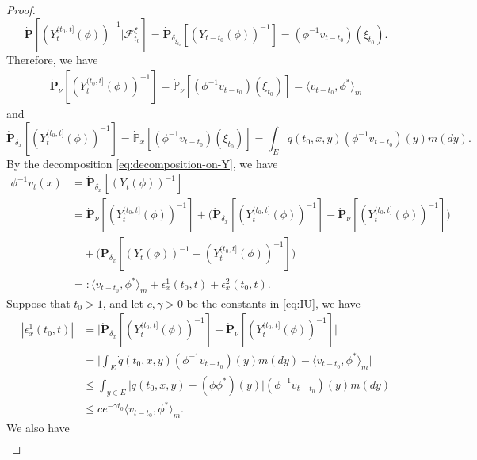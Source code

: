 \documentclass[UTF8]{pkuthss}
\theoremstyle{plain}
\theoremstyle{definition}
\numberwithin{equation}{section}
\begin{document}
\begin{proof}
\[
	\dot{\mathbf P} [(Y_t^{(t_0,t]}(\phi))^{-1}|\mathscr F^\xi_{t_0}]
	= \dot{\mathbf P}_{\delta_{\xi_{t_0}}}[(Y_{t-t_0}(\phi))^{-1}]
	= (\phi^{-1}v_{t-t_0})(\xi_{t_0}).
\]
	Therefore, we have
\[\begin{split}
	\dot{\mathbf P}_\nu[(Y_t^{(t_0,t]}(\phi))^{-1}]
	= \dot{\mathbb P}_{\nu}[(\phi^{-1}v_{t-t_0})(\xi_{t_0}) ]
	= \langle v_{t-t_0},\phi^* \rangle_m
\end{split}\]
	and
\begin{equation}
\label{eq:Yt0t}
	\dot{\mathbf P}_{\delta_x}[(Y_t^{(t_0,t]}(\phi))^{-1}]
	= \dot{\mathbb P}_x[(\phi^{-1}v_{t-t_0})(\xi_{t_0}) ]
	=  \int_E  \dot{q}(t_0,x,y)(\phi^{-1}v_{t-t_0})(y) m(dy).
\end{equation}
	By the decomposition \eqref{eq:decomposition-on-Y}, we have
\begin{equation}\label{eq:vt-equation}\begin{split}
	\phi^{-1}v_t(x)
	&= \dot {\mathbf P}_{\delta_x} [(Y_t(\phi))^{-1}]\\
	&= \dot {\mathbf P}_\nu [(Y^{(t_0,t]}_t(\phi))^{-1}] + \big( \dot {\mathbf P}_{\delta_x} [(Y^{(t_0,t]}_t(\phi))^{-1}] - \dot {\mathbf P}_\nu [(Y^{(t_0,t]}_t(\phi))^{-1}] \big) \\
	&\quad + \big( \dot{\mathbf P}_{\delta_x}[(Y_t(\phi))^{-1} - (Y^{(t_0,t]}_t(\phi))^{-1}] \big)\\
	&=: \langle v_{t-t_0},\phi^* \rangle_m + \epsilon_x^1(t_0,t) +\epsilon_x^2(t_0,t).
\end{split}\end{equation}
	Suppose that $t_0 >1$, and let $c,\gamma > 0$ be the constants in \eqref{eq:IU}, we have
\begin{equation}\label{eq:epsilon-1}\begin{split}
	|\epsilon_x^1(t_0,t)|
	& = \big| \dot {\mathbf P}_{\delta_x} [(Y^{(t_0,t]}_t(\phi))^{-1}] - \dot {\mathbf P}_\nu [(Y^{(t_0,t]}_t(\phi))^{-1}] \big| \\
	& = \big|  \int_E  \dot{q}(t_0,x,y)(\phi^{-1}v_{t-t_0})(y) m(dy) - \langle v_{t-t_0},\phi^* \rangle_m \big|\\
	& \leq \int_{y\in E} \big| \dot{q}(t_0,x,y) - (\phi\phi^*)(y) \big| (\phi^{-1}v_{t-t_0})(y) m(dy)\\
	& \leq ce^{-\gamma t_0}\langle v_{t-t_0},\phi^* \rangle_m .
\end{split}\end{equation}
	We also have
\begin{equation}\label{eq:epsilon-2}\begin{split}

\end{split}
\end{equation}
\end{proof}
\end{document}
